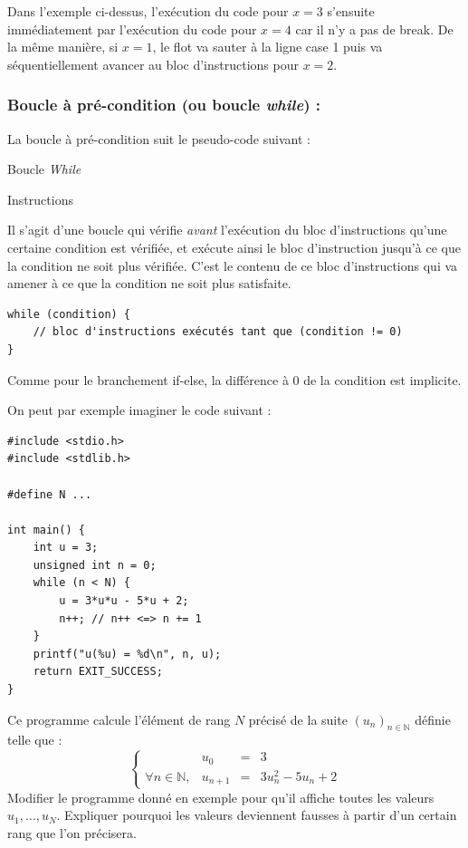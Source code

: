 \documentclass[../../../main.tex]{subfiles}
\begin{document}
Dans l'exemple ci-dessus, l'exécution du code pour $x = 3$ s'ensuite immédiatement par l'exécution du code pour $x = 4$ car il n'y a pas de \textsf{break}. De la même manière, si $x = 1$, le flot va sauter à la ligne \textsf{case 1} puis va séquentiellement avancer au bloc d'instructions pour $x = 2$.
\subsubsection{Boucle à pré-condition (ou boucle \textit{while}) :}
La boucle à pré-condition suit le pseudo-code suivant :
\begin{algorithm}
\caption{Boucle \textit{While}}
 {
	Instructions
}
\end{algorithm}
\newline
Il s'agit d'une boucle qui vérifie \textit{avant} l'exécution du bloc d'instructions qu'une certaine condition est vérifiée, et exécute ainsi le bloc d'instruction jusqu'à ce que la condition ne soit plus vérifiée. C'est le contenu de ce bloc d'instructions qui va amener à ce que la condition ne soit plus satisfaite.
\begin{verbatim}
while (condition) {
	// bloc d'instructions exécutés tant que (condition != 0)
}
\end{verbatim}
Comme pour le branchement \textsf{if-else}, la différence à 0 de la condition est implicite.
 
On peut par exemple imaginer le code suivant :
\begin{verbatim}
#include <stdio.h>
#include <stdlib.h>

#define N ...

int main() {
	int u = 3;
	unsigned int n = 0;
	while (n < N) {
		u = 3*u*u - 5*u + 2;
		n++; // n++ <=> n += 1
	}
	printf("u(%u) = %d\n", n, u);
	return EXIT_SUCCESS;
}
\end{verbatim}
Ce programme calcule l'élément de rang $N$ précisé de la suite $(u_{n})_{n\in{\mathbb{N}}}$ définie telle que :
$$
\left\{\begin{array}{llcl}
& u_{0} & = & 3 \\
\forall{n\in{\mathbb{N}}}, & u_{n+1} & = & 3u_{n}^{2} - 5u_{n} + 2
\end{array}\right.
$$
\exercise{[COURS]} Modifier le programme donné en exemple pour qu'il affiche toutes les valeurs $u_{1}, \dots, u_{N}$. \newline
Expliquer pourquoi les valeurs deviennent fausses à partir d'un certain rang que l'on précisera.
 
\end{document}
